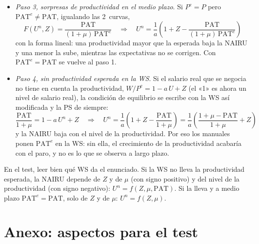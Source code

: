 \documentclass[11pt]{article}
\begin{document}
\begin{itemize}
\begin{itemize}
  \item una productividad mayor que la esperada ($\varepsilon^{\mathrm{PAT}}_t>0$) baja la inflación con el mismo paro: es como si la NAIRU bajara a $(\mu+Z-\varepsilon^{\mathrm{PAT}}_t)/a$ mientras las expectativas se ajustan. Es la explicación de \textcite{BallMankiw2002NAIRU} para Estados Unidos en los 90. \findemo
  \end{itemize}
\item \emph{Paso 3, sorpresas de productividad en el medio plazo}. Si $P^e=P$ pero $\mathrm{PAT}^e\neq\mathrm{PAT}$, igualando las 2~curvas,
  \begin{equation*}
  F(U^n,Z)=\frac{\mathrm{PAT}}{(1+\mu)\,\mathrm{PAT}^e}\quad\Longrightarrow\quad U^n=\frac{1}{a}\left(1+Z-\frac{\mathrm{PAT}}{(1+\mu)\,\mathrm{PAT}^e}\right)
  \end{equation*}
  con la forma lineal: una productividad mayor que la esperada baja la NAIRU y una menor la sube, mientras las expectativas no se corrigen. Con $\mathrm{PAT}^e=\mathrm{PAT}$ se vuelve al paso 1. \findemo
\item \emph{Paso 4, sin productividad esperada en la WS}. Si el salario real que se negocia no tiene en cuenta la productividad, $W/P^e=1-a\,U+Z$ (el «1» es ahora un nivel de salario real), la condición de equilibrio se escribe con la WS así modificada y la PS de siempre:
  \begin{equation*}
  \frac{\mathrm{PAT}}{1+\mu}=1-a\,U^n+Z\quad\Longrightarrow\quad U^n=\frac{1}{a}\left(1+Z-\frac{\mathrm{PAT}}{1+\mu}\right)=\frac{1}{a}\left(\frac{1+\mu-\mathrm{PAT}}{1+\mu}+Z\right)
  \end{equation*}
  y la NAIRU baja con el nivel de la productividad. Por eso los manuales ponen $\mathrm{PAT}^e$ en la WS: sin ella, el crecimiento de la productividad acabaría con el paro, y no es lo que se observa a largo plazo. \findemo
\end{itemize}

\begin{notaopositor}
En el test, leer bien qué WS da el enunciado. Si la WS no lleva la productividad esperada, la NAIRU depende de $Z$ y de $\mu$ (con signo positivo) y del nivel de la productividad (con signo negativo): $U^n=f(Z,\mu,\mathrm{PAT})$. Si la lleva y a medio plazo $\mathrm{PAT}^e=\mathrm{PAT}$, solo de $Z$ y de $\mu$: $U^n=f(Z,\mu)$.
\end{notaopositor}

\section{Anexo: aspectos para el test}\label{anexo:test}
\end{document}
